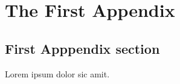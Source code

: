\documentclass[12pt,endorse]{ukydissertation}
\begin{document}
\backmatter

\chapter{The First Appendix}
\label{cha:first-appendix}

\section{First Apppendix section}
\label{sec:first-appp-sect}
Lorem ipsum dolor sic amit.

\clearpage
{}
 
 
\end{document}
